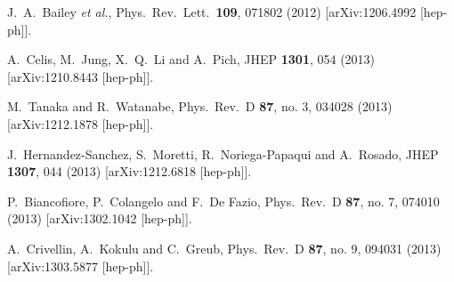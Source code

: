 \documentclass[prd,preprint,superscriptaddress,amsmath,amssymb]{revtex4}
\begin{document}
\begin{thebibliography}{100}
  J.~A.~Bailey {\it et al.},
  Phys.\ Rev.\ Lett.\  {\bf 109}, 071802 (2012)
  [arXiv:1206.4992 [hep-ph]].

  A.~Celis, M.~Jung, X.~Q.~Li and A.~Pich,
  JHEP {\bf 1301}, 054 (2013)
  [arXiv:1210.8443 [hep-ph]].
  
  M.~Tanaka and R.~Watanabe,
  Phys.\ Rev.\ D {\bf 87}, no. 3, 034028 (2013)
  [arXiv:1212.1878 [hep-ph]].

  J.~Hernandez-Sanchez, S.~Moretti, R.~Noriega-Papaqui and A.~Rosado,
  JHEP {\bf 1307}, 044 (2013)
  [arXiv:1212.6818 [hep-ph]].



  P.~Biancofiore, P.~Colangelo and F.~De Fazio,
  Phys.\ Rev.\ D {\bf 87}, no. 7, 074010 (2013)
  [arXiv:1302.1042 [hep-ph]].
  
  A.~Crivellin, A.~Kokulu and C.~Greub,
  Phys.\ Rev.\ D {\bf 87}, no. 9, 094031 (2013)
  [arXiv:1303.5877 [hep-ph]].



\end{thebibliography}
\end{document}
